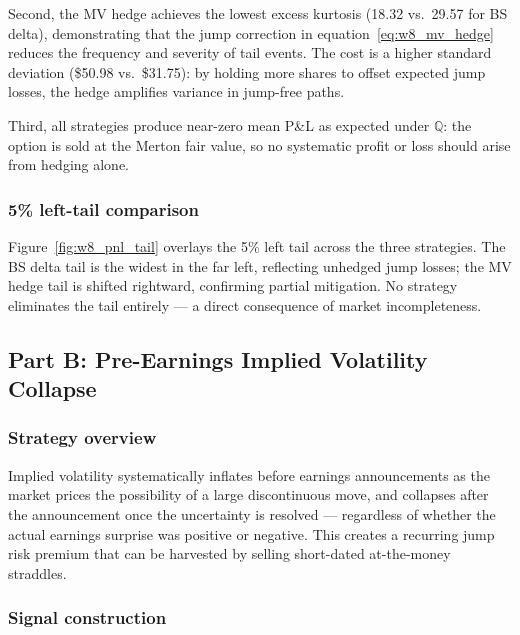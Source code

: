 \documentclass[12pt]{article}
\begin{document}
Second, the MV hedge achieves the lowest excess kurtosis (18.32 vs.\
29.57 for BS delta), demonstrating that the jump correction in
equation~\eqref{eq:w8_mv_hedge} reduces the frequency and severity of
tail events.
The cost is a higher standard deviation (\$50.98 vs.\ \$31.75): by
holding more shares to offset expected jump losses, the hedge amplifies
variance in jump-free paths.

Third, all strategies produce near-zero mean P\&L as expected under
$\mathbb{Q}$: the option is sold at the Merton fair value, so no
systematic profit or loss should arise from hedging alone.

\subsubsection*{5\% left-tail comparison}

Figure~\ref{fig:w8_pnl_tail} overlays the 5\% left tail across the three
strategies.
The BS delta tail is the widest in the far left, reflecting unhedged
jump losses; the MV hedge tail is shifted rightward, confirming partial
mitigation.
No strategy eliminates the tail entirely — a direct consequence of
market incompleteness.

\subsection*{Part B: Pre-Earnings Implied Volatility Collapse}

\subsubsection*{Strategy overview}

Implied volatility systematically inflates before earnings announcements
as the market prices the possibility of a large discontinuous move, and
collapses after the announcement once the uncertainty is resolved — 
regardless of whether the actual earnings surprise was positive or
negative.
This creates a recurring jump risk premium that can be harvested by
selling short-dated at-the-money straddles.

\subsubsection*{Signal construction}
\end{document}
